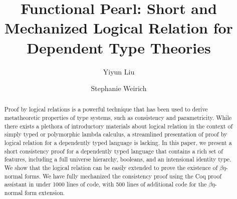 \documentclass[acmsmall,screen=true,
\ifpublic review=false\else,review=true\fi
  ,anonymous=\ifanonymous true\else false\fi]{acmart}
\begin{document}
\title{Functional Pearl: Short and Mechanized Logical Relation for Dependent Type Theories}

\author{Yiyun Liu}

\author{Stephanie Weirich}


\begin{abstract}
Proof by logical relations is a powerful technique that has been used
to derive metatheoretic properties of type systems, such as
consistency and parametricity. While there exists a
plethora of introductory materials about logical relation in the
context of simply typed or polymorphic lambda calculus, a streamlined
presentation of proof by logical relation for a dependently typed language
is lacking. In this paper, we present a short
consistency proof for a dependently typed language that contains a
rich set of features, including a full universe
hierarchy, booleans, and an intensional identity type. We show that
the logical relation can be easily extended to prove the existence of
$\beta\eta$-normal forms.
We have
fully mechanized the consistency proof using the Coq proof assistant
in under 1000 lines of code, with 500 lines of additional code for the
$\beta\eta$-normal form extension.
\end{abstract}

\end{document}

